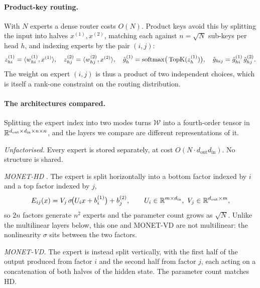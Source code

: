 \paragraph{Product-key routing.} With $N$ experts a dense router costs $O(N)$.
Product keys \citep{lample2019productkeys} avoid this by splitting the input
into halves $x^{(1)}, x^{(2)}$, matching each against $n = \sqrt{N}$ sub-keys
per head $h$, and indexing experts by the pair $(i,j)$:
\begin{equation}
  z^{(1)}_{hi} = \langle w^{(1)}_{hi}, x^{(1)} \rangle, \quad
  z^{(2)}_{hj} = \langle w^{(2)}_{hj}, x^{(2)} \rangle, \quad
  \hat{g}^{(1)}_h = \operatorname{softmax}\!\big(\operatorname{TopK}(z^{(1)}_h)\big), \quad
  \hat{g}_{hij} = \hat{g}^{(1)}_{hi}\,\hat{g}^{(2)}_{hj}.
  \label{eq:product-key}
\end{equation}
The weight on expert $(i,j)$ is thus a product of two independent choices,
which is itself a rank-one constraint on the routing distribution.

\paragraph{The architectures compared.} Splitting the expert index into two
modes turns $\mathcal{W}$ into a fourth-order tensor in $\mathbb{R}^{d_{\mathrm{out}}
\times d_{\mathrm{in}} \times n \times n}$, and the layers we compare are
different representations of it.

\emph{Unfactorised.} Every expert is stored separately, at cost $O(N \cdot
d_{\mathrm{out}} d_{\mathrm{in}})$. No structure is shared.

\emph{MONET-HD} \citep{park2025monet}. The expert is split horizontally into a
bottom factor indexed by $i$ and a top factor indexed by $j$,
\begin{equation}
  E_{ij}(x) = V_j\, \sigma\!\big(U_i x + b^{(1)}_i\big) + b^{(2)}_j,
  \qquad U_i \in \mathbb{R}^{m \times d_{\mathrm{in}}},\ V_j \in \mathbb{R}^{d_{\mathrm{out}}
  \times m},
  \label{eq:hd}
\end{equation}
so $2n$ factors generate $n^2$ experts and the parameter count grows as
$\sqrt{N}$. Unlike the multilinear layers below, this one and MONET-VD are not multilinear: the
nonlinearity $\sigma$ sits between the two factors.

\emph{MONET-VD.} The expert is instead split vertically, with the first half
of the output produced from factor $i$ and the second half from factor $j$,
each acting on a concatenation of both halves of the hidden state. The
parameter count matches HD.

